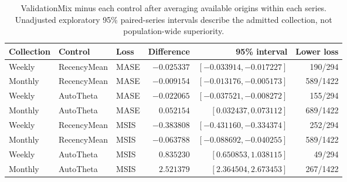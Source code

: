 \begin{table}[htbp]\centering\small
\caption{ValidationMix minus each control after averaging available origins within each series. Unadjusted exploratory 95\% paired-series intervals describe the admitted collection, not population-wide superiority.}
\label{tab:paired-main}
\begin{tabular}{lllrrr}\toprule
Collection & Control & Loss & Difference & 95\% interval & Lower loss\\\midrule
Weekly & RecencyMean & MASE & $-0.025337$ & $[-0.033914,-0.017227]$ & 190/294\\
Monthly & RecencyMean & MASE & $-0.009154$ & $[-0.013176,-0.005173]$ & 589/1422\\
Weekly & AutoTheta & MASE & $-0.022065$ & $[-0.037521,-0.008272]$ & 155/294\\
Monthly & AutoTheta & MASE & $0.052154$ & $[0.032437,0.073112]$ & 689/1422\\
Weekly & RecencyMean & MSIS & $-0.383808$ & $[-0.431160,-0.334374]$ & 252/294\\
Monthly & RecencyMean & MSIS & $-0.063788$ & $[-0.088692,-0.040255]$ & 589/1422\\
Weekly & AutoTheta & MSIS & $0.835230$ & $[0.650853,1.038115]$ & 49/294\\
Monthly & AutoTheta & MSIS & $2.521379$ & $[2.364504,2.673453]$ & 267/1422\\
\bottomrule\end{tabular}\end{table}
